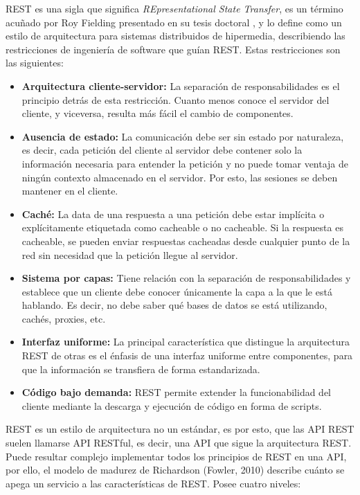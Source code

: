 REST es una sigla que significa \textit{REpresentational State Transfer}, es un término acuñado por Roy Fielding presentado en su tesis doctoral \cite{fieldingapi}, y lo define como un estilo de arquitectura para sistemas distribuidos de hipermedia, describiendo las restricciones de ingeniería de software que guían REST. Estas restricciones son las siguientes:
\begin{itemize}
    \item \textbf{Arquitectura cliente-servidor:} La separación de responsabilidades es el principio detrás de esta restricción. Cuanto menos conoce el servidor del cliente, y viceversa, resulta más fácil el cambio de componentes.
    \item \textbf{Ausencia de estado:} La comunicación debe ser sin estado por naturaleza, es decir, cada petición del cliente al servidor debe contener solo la información necesaria para entender la petición y no puede tomar ventaja de ningún contexto almacenado en el servidor. Por esto, las sesiones se deben mantener en el cliente.
    \item \textbf{Caché:} La data de una respuesta a una petición debe estar implícita o explícitamente etiquetada como cacheable o no cacheable. Si la respuesta es cacheable, se pueden enviar respuestas cacheadas desde cualquier punto de la red sin necesidad que la petición llegue al servidor.
    \item \textbf{Sistema por capas:} Tiene relación con la separación de responsabilidades y establece que un cliente debe conocer únicamente la capa a la que le está hablando.  Es decir, no debe saber qué bases de datos se está utilizando, cachés, proxies, etc.
    \item \textbf{Interfaz uniforme:} La principal característica que distingue la arquitectura REST de otras es el énfasis de una interfaz uniforme entre componentes, para que la información se transfiera de forma estandarizada. 
    \item \textbf{Código bajo demanda:} REST permite extender la funcionabilidad del cliente mediante la descarga y ejecución de código en forma de scripts. 
\end{itemize}
REST es un estilo de arquitectura no un estándar, es por esto, que las API REST suelen llamarse API RESTful, es decir, una API que sigue la arquitectura REST. Puede resultar complejo implementar todos los principios de REST en una API, por ello, el modelo de madurez de Richardson (Fowler, 2010) describe cuánto se apega un servicio a las características de REST. Posee cuatro niveles:
